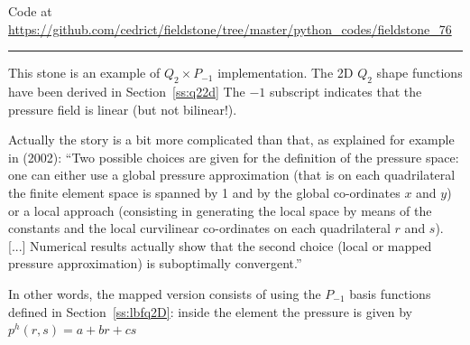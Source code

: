 

\begin{center}
Code at \url{https://github.com/cedrict/fieldstone/tree/master/python_codes/fieldstone_76}
\end{center}

\par\noindent\rule{\textwidth}{0.4pt}



This stone is an example of $Q_2\times P_{-1}$ implementation. 
The 2D $Q_2$ shape functions have been derived in Section~\ref{ss:q22d}
The $-1$ subscript indicates that the pressure field is linear (but not bilinear!).

Actually the story is a bit more complicated than that, as explained for 
example in \textcite{boga02} (2002):
``Two possible choices are given for the definition of the pressure space: 
one can either use a global pressure approximation (that is on
each quadrilateral the finite element space is spanned by 1 and by the global co-ordinates $x$ and $y$)
or a local approach (consisting in generating the local space by means of the constants and the local
curvilinear co-ordinates on each quadrilateral $r$ and $s$). [...] Numerical results actually show
that the second choice (local or mapped pressure approximation) is suboptimally convergent.'' 

In other words, the mapped version consists of  
using the $P_{-1}$ basis functions defined in Section~\ref{ss:lbfq2D}:
inside the element the pressure is given by $p^h(r,s)=a+br+cs$ 

